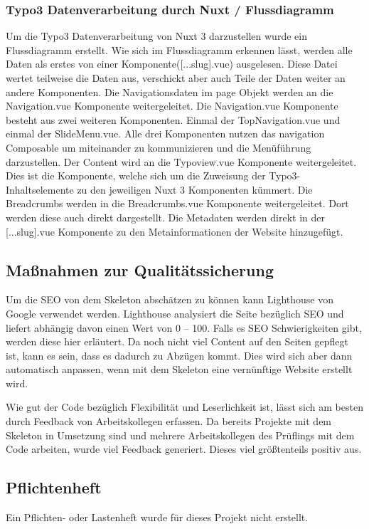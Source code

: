 \subsubsection{Typo3 Datenverarbeitung durch Nuxt / Flussdiagramm}
\label{sec:Typo3 Datenverarbeitung durch Nuxt / Flussdiagramm} 

Um die Typo3 Datenverarbeitung von Nuxt 3 darzustellen wurde ein Flussdiagramm erstellt. Wie sich im Flussdiagramm erkennen lässt, werden alle Daten als erstes von einer Komponente([...slug].vue) ausgelesen. Diese Datei wertet teilweise die Daten aus, verschickt aber auch Teile der Daten weiter an andere Komponenten. Die Navigationsdaten im page Objekt werden an die Navigation.vue Komponente weitergeleitet. Die Navigation.vue Komponente besteht aus zwei weiteren Komponenten. Einmal der TopNavigation.vue und einmal der SlideMenu.vue. Alle drei Komponenten nutzen das navigation Composable um miteinander zu kommunizieren und die Menüführung darzustellen. Der Content wird an die Typoview.vue Komponente weitergeleitet. Dies ist die Komponente, welche sich um die Zuweisung der Typo3-Inhaltselemente zu den jeweiligen Nuxt 3 Komponenten kümmert. Die Breadcrumbs werden in die Breadcrumbs.vue Komponente weitergeleitet. Dort werden diese auch direkt dargestellt. Die Metadaten werden direkt in der [...slug].vue Komponente zu den Metainformationen der Website hinzugefügt.

\subsection{Maßnahmen zur Qualitätssicherung}
\label{sec:Qualitaetssicherung}

Um die SEO von dem Skeleton abschätzen zu können kann Lighthouse von Google verwendet werden. Lighthouse analysiert die Seite bezüglich SEO und liefert abhängig davon einen Wert von 0 – 100. Falls es SEO Schwierigkeiten gibt, werden diese hier erläutert. Da noch nicht viel Content auf den Seiten gepflegt ist, kann es sein, dass es dadurch zu Abzügen kommt. Dies wird sich aber dann automatisch anpassen, wenn mit dem Skeleton eine vernünftige Website erstellt wird.

Wie gut der Code bezüglich Flexibilität und Leserlichkeit ist, lässt sich am besten durch Feedback von Arbeitskollegen erfassen. Da bereits Projekte mit dem Skeleton in Umsetzung sind und mehrere Arbeitskollegen des Prüflings mit dem Code arbeiten, wurde viel Feedback generiert. Dieses viel größtenteils positiv aus.

\subsection{Pflichtenheft}
\label{sec:Pflichtenheft}

Ein Pflichten- oder Lastenheft wurde für dieses Projekt nicht erstellt. 

